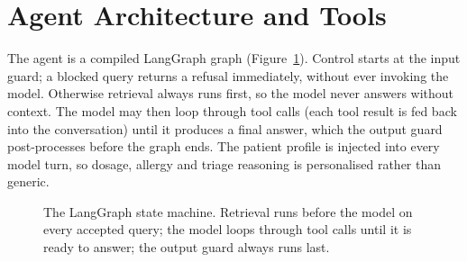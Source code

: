 \documentclass[11pt,a4paper]{article}
\begin{document}
\section{Agent Architecture and Tools}

The agent is a compiled LangGraph graph (Figure~\ref{fig:graph}). Control starts at the input guard;
a blocked query returns a refusal immediately, without ever invoking the model. Otherwise retrieval
always runs first, so the model never answers without context. The model may then loop through tool
calls (each tool result is fed back into the conversation) until it produces
a final answer, which the output guard post-processes before the graph ends. The patient profile is
injected into every model turn, so dosage, allergy and triage reasoning is personalised rather than
generic.

\begin{figure}[H]
\centering
{}
\caption{The LangGraph state machine. Retrieval runs before the model on every accepted query; the
model loops through tool calls until it is ready to answer; the output guard always runs last.}
\label{fig:graph}
\end{figure}
\end{document}
